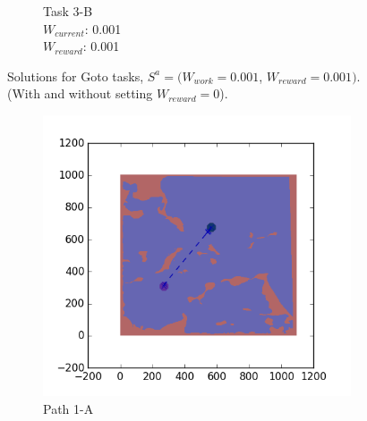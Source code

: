 \documentclass{tamuccthesis}
\begin{document}
\begin{figure}
\begin{subfigure}[b]{0.24\textwidth}
        \caption{{\small Task 3-B \\ $W_{current}$: 0.001 \\ $W_{reward}$: 0.001}}   
        \label{fig:Path_3-B_upCurrent_Reward}
    \end{subfigure}
    \caption[Solutions for Goto tasks using weights $S^a$.]{Solutions for Goto tasks, $S^a = (W_{work} = 0.001$, $W_{reward} = 0.001)$. \\ (With and without setting $W_{reward} = 0$).}
    \label{fig:weights_Sa}
\end{figure}

\begin{figure}
    \centering
    \begin{subfigure}[b]{0.24\textwidth}
        \centering
            \includegraphics[width=\textwidth,trim={4cm 3cm 2cm 3cm},clip]{EXP3RG_PathAa_-1_-1_0d01_0d005.png}
        \caption{Path 1-A }    
        \label{fig:Path_1-A_upReward_upWork_b}
    \end{subfigure}
    \begin{subfigure}[b]{0.24\textwidth}  
        \centering 

\end{subfigure}
\end{figure}
\end{document}
